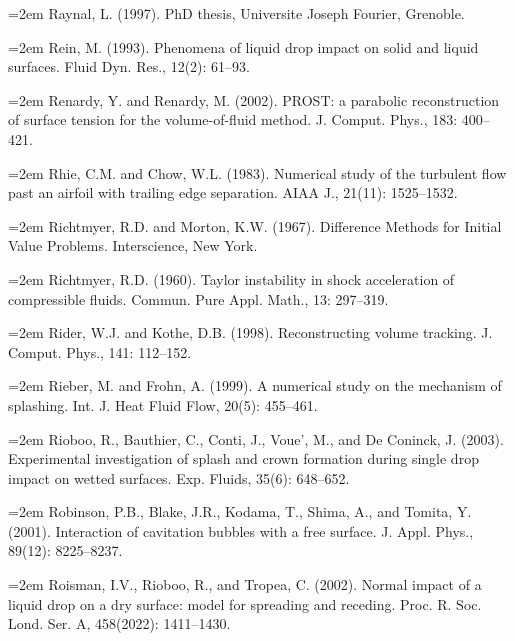 \documentclass[11pt,a4paper,openany,fontset=none]{ctexbook}
\begin{document}
\par\hangindent=2em Raynal, L. (1997). PhD thesis, Universite Joseph Fourier, Grenoble.

\par\hangindent=2em Rein, M. (1993). Phenomena of liquid drop impact on solid and liquid surfaces. Fluid Dyn. Res., 12(2): 61--93.

\par\hangindent=2em Renardy, Y. and Renardy, M. (2002). PROST: a parabolic reconstruction of surface tension for the volume-of-fluid method. J. Comput. Phys., 183: 400--421.

\par\hangindent=2em Rhie, C.M. and Chow, W.L. (1983). Numerical study of the turbulent flow past an airfoil with trailing edge separation. AIAA J., 21(11): 1525--1532.

\par\hangindent=2em Richtmyer, R.D. and Morton, K.W. (1967). Difference Methods for Initial Value Problems. Interscience, New York.


\par\hangindent=2em Richtmyer, R.D. (1960). Taylor instability in shock acceleration of compressible fluids. Commun. Pure Appl. Math., 13: 297--319.

\par\hangindent=2em Rider, W.J. and Kothe, D.B. (1998). Reconstructing volume tracking. J. Comput. Phys., 141: 112--152.

\par\hangindent=2em Rieber, M. and Frohn, A. (1999). A numerical study on the mechanism of splashing. Int. J. Heat Fluid Flow, 20(5): 455--461.

\par\hangindent=2em Rioboo, R., Bauthier, C., Conti, J., Voue', M., and De Coninck, J. (2003). Experimental investigation of splash and crown formation during single drop impact on wetted surfaces. Exp. Fluids, 35(6): 648--652.

\par\hangindent=2em Robinson, P.B., Blake, J.R., Kodama, T., Shima, A., and Tomita, Y. (2001). Interaction of cavitation bubbles with a free surface. J. Appl. Phys., 89(12): 8225--8237.

\par\hangindent=2em Roisman, I.V., Rioboo, R., and Tropea, C. (2002). Normal impact of a liquid drop on a dry surface: model for spreading and receding. Proc. R. Soc. Lond. Ser. A, 458(2022): 1411--1430.
\end{document}
